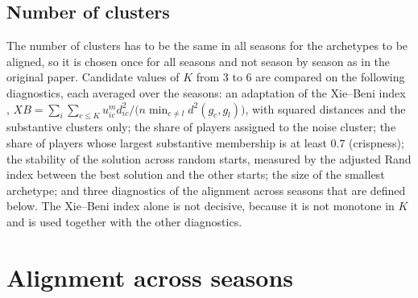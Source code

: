\subsection{Number of clusters}
\label{sec:method-K}

The number of clusters has to be the same in all seasons for the archetypes to be aligned, so it is chosen once for all seasons and not season by season as in the original paper. Candidate values of $K$ from 3 to 6 are compared on the following diagnostics, each averaged over the seasons: an adaptation of the Xie--Beni index \cite{xie1991validity}, $XB=\sum_i\sum_{c\le K}u_{ic}^m d_{ic}^2\big/\bigl(n\min_{c\ne l}d^2(g_c,g_l)\bigr)$, with squared distances and the substantive clusters only; the share of players assigned to the noise cluster; the share of players whose largest substantive membership is at least $0.7$ (crispness); the stability of the solution across random starts, measured by the adjusted Rand index between the best solution and the other starts; the size of the smallest archetype; and three diagnostics of the alignment across seasons that are defined below. The Xie--Beni index alone is not decisive, because it is not monotone in $K$ and is used together with the other diagnostics.

\section{Alignment across seasons}
\label{sec:method-alignment}

